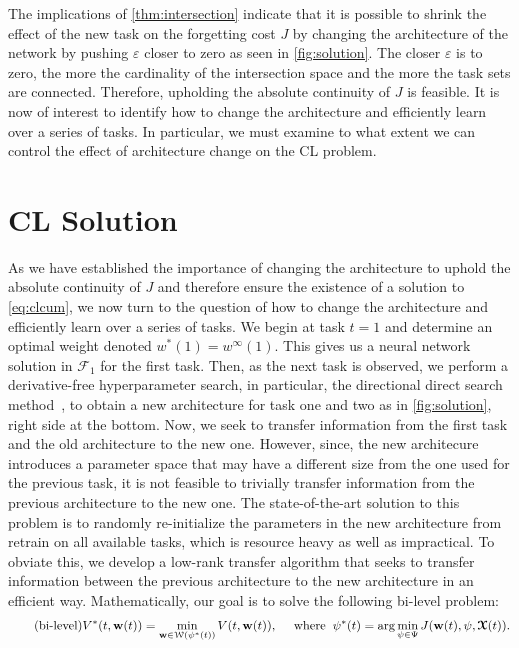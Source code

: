 The implications of \cref{thm:intersection} indicate that it is possible to shrink the effect of the new task on the forgetting cost $J$ by changing the architecture of the network by pushing $\varepsilon$ closer to zero as seen in \cref{fig:solution}. The closer $\varepsilon$ is to zero, the more the cardinality of the intersection space and the more the task sets are connected. Therefore, upholding the absolute continuity of $J$ is feasible. It is now of interest to identify how to change the architecture and efficiently learn over a series of tasks. In particular, we must examine to what extent we can control the effect of architecture change on the CL problem. 

\section{CL Solution}\label{sec:clsolution}
As we have established the importance of changing the architecture to uphold the absolute continuity of $J$ and therefore ensure the existence of a solution to \eqref{eq:clcum}, we now turn to the question of how to change the architecture and efficiently learn over a series of tasks. We begin at task $t = 1$ and determine an optimal weight denoted $w^*(1) = w^\infty(1).$ This gives us a neural network solution in $\mathcal{F}_1$ for the first task. Then, as the next task is observed, we perform a derivative-free hyperparameter search, in particular, the directional direct search method~\cite{larson2019derivative}, to obtain a new architecture for task one and two as in \cref{fig:solution}, right side at the bottom. Now, we seek to transfer information from the first task and the old architecture to the new one. However, since, the new architecure introduces a parameter space that may have a different size from the one used for the previous task, it is not feasible to trivially transfer information from the previous architecture to the new one.  The state-of-the-art solution to this problem is to randomly re-initialize the parameters in the new architecture from retrain on all available tasks, which is resource heavy as well as impractical. To obviate this, we develop a low-rank transfer algorithm that seeks to transfer information between the previous architecture to the new architecture in an efficient way. Mathematically, our goal is to solve the following bi-level problem:
\begin{align}\label{eq:bilevel} \tag{bi-level}
      V^*(t,\boldsymbol{\mathrm{w}}(t))  = \min_{\boldsymbol{\mathrm{w}} \in \mathcal{W}(\psi^*(t))} V(t,\boldsymbol{\mathrm{w}}(t)),\quad \text{ where}\; \;  \psi^*(t)  = \mathrm{arg}\min_{\psi\in \Psi} J(\boldsymbol{\mathrm{w}}(t),\psi,\boldsymbol{\mathcal{X}}(t)).
\end{align}
